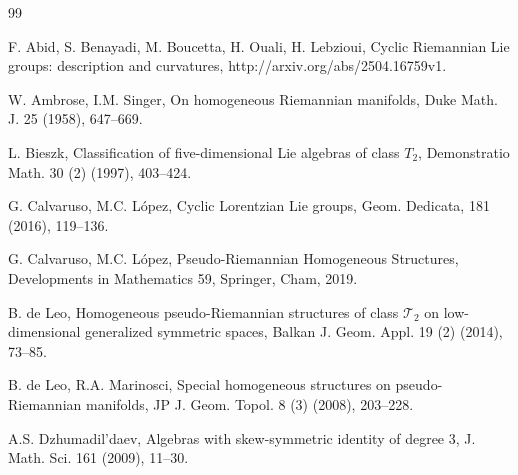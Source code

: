 \documentclass[reqno]{amsart}
\theoremstyle{definition}
\begin{document}
\begin{thebibliography}{99}

 F. Abid, S. Benayadi, M. Boucetta, H. Ouali, H. Lebzioui,
Cyclic Riemannian Lie groups: description and curvatures, http://arxiv.org/abs/2504.16759v1.

 W. Ambrose, I.M. Singer, On homogeneous Riemannian manifolds, Duke Math. J. 25 (1958), 647--669.

  L. Bieszk, Classification of five-dimensional Lie algebras of class $T_{2}$, Demonstratio Math. 30 (2) (1997), 403--424.


 G. Calvaruso, M.C. L\'{o}pez, Cyclic Lorentzian Lie groups, Geom. Dedicata, 181 (2016), 119--136.

 G. Calvaruso, M.C. L\'{o}pez, Pseudo-Riemannian Homogeneous Structures,
 Developments in Mathematics 59, Springer, Cham, 2019.







 B. de Leo, Homogeneous pseudo-Riemannian structures of class $\mathcal{T}_{2}$ on low-dimensional generalized symmetric spaces, Balkan J. Geom. Appl. 19 (2) (2014), 73--85.

 B. de Leo,  R.A. Marinosci, Special homogeneous structures on pseudo-Riemannian manifolds, JP J. Geom. Topol. 8 (3) (2008), 203--228.

 A.S. Dzhumadil'daev, Algebras with skew-symmetric identity of degree 3, J. Math. Sci. 161 (2009), 11--30.


\end{thebibliography}
\end{document}
